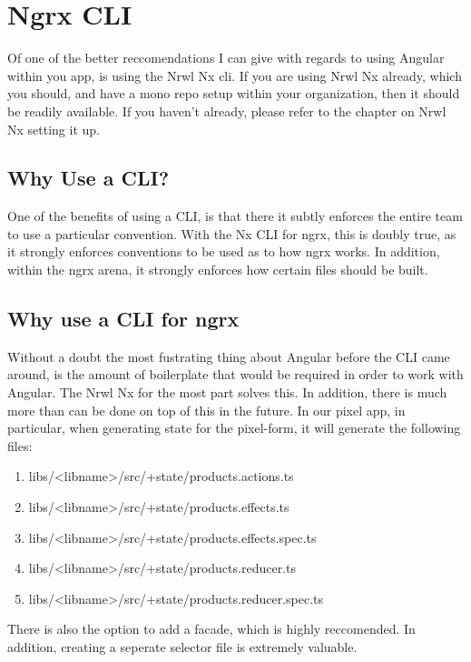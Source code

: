 \maketitle{}
\section{ Ngrx CLI }

Of one of the better reccomendations I can give with regards to using Angular
within you app, is using the Nrwl Nx cli. If you are using Nrwl Nx already,
which you should, and have a mono repo setup within your organization, then
it should be readily available. If you haven't already, please refer to the
chapter on Nrwl Nx setting it up.

\subsection{ Why Use a CLI? }
One of the benefits of using a CLI, is that there it subtly enforces the entire
team to use a particular convention. With the Nx CLI for ngrx, this is doubly
true, as it strongly enforces conventions to be used as to how ngrx works. In
addition, within the ngrx arena, it strongly enforces how certain files should
be built. 

\subsection{ Why use a CLI for ngrx }
Without a doubt the most fustrating thing about Angular before the CLI came
around, is the amount of boilerplate that would be required in order to work
with Angular. The Nrwl Nx for the most part solves this. In addition, there is
much more than can be done on top of this in the future. In our pixel app, in
particular, when generating state for the pixel-form, it will generate the
following files:
\begin{enumerate}
  \item libs/<libname>/src/+state/products.actions.ts
  \item libs/<libname>/src/+state/products.effects.ts
  \item libs/<libname>/src/+state/products.effects.spec.ts
  \item libs/<libname>/src/+state/products.reducer.ts
  \item libs/<libname>/src/+state/products.reducer.spec.ts
\end{enumerate}

There is also the option to add a facade, which is highly reccomended. In
addition, creating a seperate selector file is extremely valuable.
